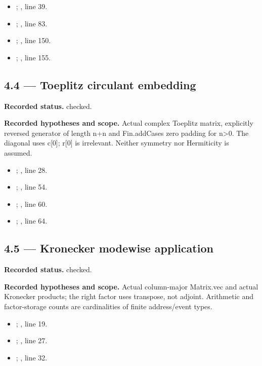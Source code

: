 \begin{itemize}
\item {}; , line 39.
\item {}; , line 83.
\item {}; , line 150.
\item {}; , line 155.
\end{itemize}
\subsection{4.4 — Toeplitz circulant embedding}
\label{result:4.4}
\textbf{Recorded status.} checked.

\textbf{Recorded hypotheses and scope.} Actual complex Toeplitz matrix, explicitly reversed generator of length n+n and Fin.addCases zero padding for n>0. The diagonal uses c[0]; r[0] is irrelevant. Neither symmetry nor Hermiticity is assumed.

\begin{itemize}
\item {}; , line 28.
\item {}; , line 54.
\item {}; , line 60.
\item {}; , line 64.
\end{itemize}
\subsection{4.5 — Kronecker modewise application}
\label{result:4.5}
\textbf{Recorded status.} checked.

\textbf{Recorded hypotheses and scope.} Actual column-major Matrix.vec and actual Kronecker products; the right factor uses transpose, not adjoint. Arithmetic and factor-storage counts are cardinalities of finite address/event types.

\begin{itemize}
\item {}; , line 19.
\item {}; , line 27.
\item {}; , line 32.
\end{itemize}
